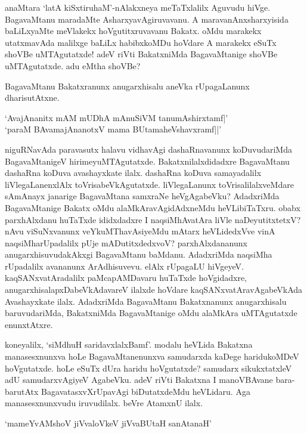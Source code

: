 anaMtara `latA kiSxtiruhaM'-nAlakxneya meTaTxlalilx Aguvudu hiVge. BagavaMtanu maradaMte AsharxyavAgiruvavanu. A maravanAnxsharxyisida baLiLxyaMte meVlakekx hoVgutitxruvavanu Bakatx. oMdu marakekx utatxmavAda malilxge baLiLx habibxkoMDu hoVdare A marakekx eSuTx shoVBe uMTAgutatxde! adeV riVti BakatxniMda BagavaMtanige shoVBe uMTAgutatxde. adu eMtha shoVBe?

BagavaMtanu Bakatxranunx anugarxhisalu aneVka rUpagaLanunx dharisutAtxne. 

\begin{shloka}
`AvajAnanitx mAM mUDhA mAnuSiVM tanumAshirxtamf|'\\
`paraM BAvamajAnanotxV mama BUtamaheVshavxramf||'
\end{shloka}

niguRNavAda paravasutx halavu vidhavAgi dashaRnavanunx koDuvudariMda BagavaMtanigeV hirimeyuMTAgutatxde. Bakatxnilalxdidadxre BagavaMtanu dashaRna koDuva avashayxkate ilalx. dashaRna koDuva samayadalilx liVlegaLanenxlAlx toVrisabeVkAgutatxde. liVlegaLanunx toVrisalilalxveMdare sAmAnayx janarige BagavaMtana samxraNe heVgAgabeVku? AdadxriMda BagavaMtanige Bakatx oMdu alaMkAravAgidAdxneMdu heVLibiTaTxru. obabx parxhAlxdanu huTaTxde ididxdadxre I naqsiMhAvatAra liVle naDeyutitxtetxV? nAvu viSuNxvanunx veYkuMThavAsiyeMdu mAtarx heVLidedxVve vinA naqsiMharUpadalilx pUje mADutitxdedxvoV? parxhAlxdananunx anugarxhisuvudakAkxgi BagavaMtanu baMdanu. AdadxriMda naqsiMha rUpadalilx avananunx ArAdhisuvevu. elAlx rUpagaLU hiVgeyeV. kaqSANxvatAradalilx paMcapAMDavaru huTaTxde hoVgidadxre, anugarxhisalapxDabeVkAdavareV ilalxde hoVdare kaqSANxvatAravAgabeVkAda Avashayxkate ilalx. AdadxriMda BagavaMtanu Bakatxnanunx anugarxhisalu baruvudariMda, BakatxniMda BagavaMtanige oMdu alaMkAra uMTAgutatxde enunxtAtxre.

koneyalilx, `siMdhuH saridavxlalxBamf'. modalu heVLida Bakatxna manasesxnunxva hoLe BagavaMtanenunxva samudarxda kaDege haridukoMDeV hoVgutatxde. hoLe eSuTx dUra haridu hoVgutatxde? samudarx sikukxtatxleV adU samudarxvAgiyeV AgabeVku. adeV riVti Bakatxna I manoVBAvane bara-barutAtx BagavatasxvXrUpavAgi biDutatxdeMdu heVLidaru. Aga manasesxnunxvudu iruvudilalx. beVre AtamxnU ilalx.

\begin{shloka}
`mameYvAMshoV jiVvaloVkeV jiVvaBUtaH sanAtanaH'
\end{shloka}

